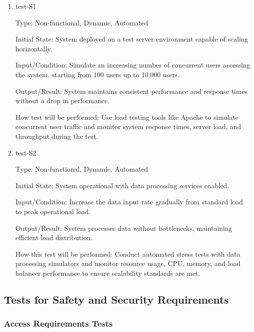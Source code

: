 \documentclass[12pt, titlepage]{article}
\begin{document}
\begin{enumerate}

    \item{test-S1} \label{test-S1}
    
    Type: Non-functional, Dynamic, Automated
    
    Initial State: System deployed on a test server environment capable of scaling horizontally.
    
    Input/Condition: Simulate an increasing number of concurrent users accessing the system, starting from 100 users up to 10,000 users.
    
    Output/Result: System maintains consistent performance and response times without a drop in performance.
    
    How test will be performed: Use load testing tools like Apache to simulate concurrent user traffic and monitor system response times, server load, and throughput during the test.
    
    \item{test-S2} \label{test-S2}
    
    Type: Non-functional, Dynamic, Automated
    
    Initial State: System operational with data processing services enabled.
    
    Input/Condition: Increase the data input rate gradually from standard load to peak operational load.
    
    Output/Result: System processes data without bottlenecks, maintaining efficient load distribution.
    
    How this test will be performed: Conduct automated stress tests with data processing simulators and monitor resource usage, CPU, memory, and load balancer performance to ensure scalability standards are met.
    
\end{enumerate}


\subsection{Tests for Safety and Security Requirements} \label{section:4.3}

\subsubsection{Access Requirements Tests} \label{section:4.3.1}
\end{document}
